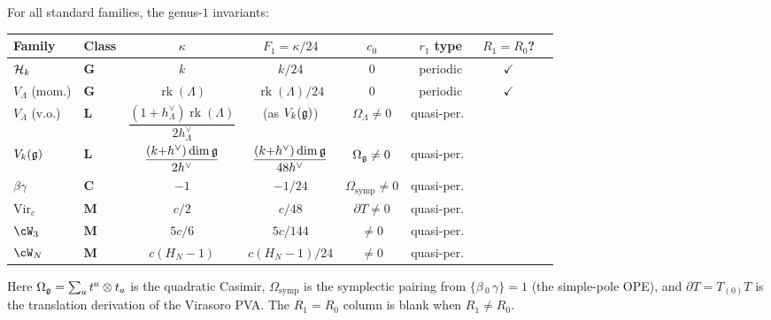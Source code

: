 \begin{computation}%
\label{comp:genus1-atlas}%
%
%
For all standard families, the genus-$1$ invariants:

\begin{center}
\small
\renewcommand{\arraystretch}{1.4}
\begin{tabular}{llcccccc}
\toprule
\textbf{Family} & \textbf{Class}
& $\kappa$ & $F_1 = \kappa/24$
& $c_0$ & \textbf{$r_1$ type}
& $R_1 {=} R_0$? \\
\midrule
$\mathcal{H}_k$ & $\mathbf{G}$
 & $k$ & $k/24$
 & $0$ & periodic
 & $\checkmark$ \\[2pt]
$V_\Lambda$ (mom.) & $\mathbf{G}$
 & $\operatorname{rk}(\Lambda)$
 & $\operatorname{rk}(\Lambda)/24$
 & $0$ & periodic
 & $\checkmark$ \\[2pt]
$V_\Lambda$ (v.o.) & $\mathbf{L}$
 & $\dfrac{(1{+}h^\vee_\Lambda)\operatorname{rk}(\Lambda)}{2h^\vee_\Lambda}$
 & (as $V_k(\mathfrak{g})$)
 & $\Omega_\Lambda \ne 0$ & quasi-per.\
 & \\[4pt]
$V_k(\mathfrak{g})$ & $\mathbf{L}$
 & $\dfrac{(k{+}h^\vee)\dim\mathfrak{g}}{2h^\vee}$
 & $\dfrac{(k{+}h^\vee)\dim\mathfrak{g}}{48h^\vee}$
 & $\Omega_{\mathfrak{g}} \ne 0$ & quasi-per.\
 & \\[4pt]
$\beta\gamma$ & $\mathbf{C}$
 & $-1$
 & $-1/24$
 & $\Omega_{\mathrm{symp}} \ne 0$ & quasi-per.\
 & \\[2pt]
$\mathrm{Vir}_c$ & $\mathbf{M}$
 & $c/2$
 & $c/48$
 & $\partial T \ne 0$ & quasi-per.\
 & \\[2pt]
$\cW_3$ & $\mathbf{M}$
 & $5c/6$
 & $5c/144$
 & $\ne 0$ & quasi-per.\
 & \\[2pt]
$\cW_N$ & $\mathbf{M}$
 & $c(H_N{-}1)$
 & $c(H_N{-}1)/24$
 & $\ne 0$ & quasi-per.\
 & \\
\bottomrule
\end{tabular}
\end{center}
Here $\Omega_{\mathfrak{g}} = \sum_a t^a \otimes t_a$ is the
quadratic Casimir,
$\Omega_{\mathrm{symp}}$ is the symplectic pairing
from $\{\beta \,{}_0\, \gamma\} = 1$
\textup{(}the simple-pole OPE\textup{)},
and $\partial T = T_{(0)}T$ is the translation
derivation of the Virasoro PVA\@. The $R_1 = R_0$
column is blank when $R_1 \ne R_0$.
\end{computation}

